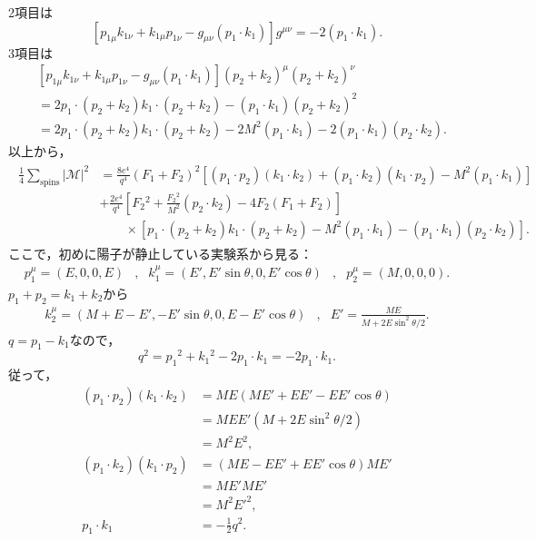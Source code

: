 2項目は
\[  [ p_{1\mu}k_{1\nu} + k_{1\mu}p_{1\nu} - g_{\mu\nu} (p_1 \cdot k_1) ] g^{\mu\nu} = -2 (p_1 \cdot k_1) . \]
3項目は
\begin{align*}
  & [ p_{1\mu}k_{1\nu} + k_{1\mu}p_{1\nu} - g_{\mu\nu} (p_1 \cdot k_1) ] (p_2 + k_2)^\mu (p_2 + k_2)^\nu \\
  &= 2 p_1 \cdot (p_2 + k_2) k_1 \cdot (p_2 + k_2) - (p_1 \cdot k_1) (p_2 + k_2)^2 \\
  &= 2 p_1 \cdot (p_2 + k_2) k_1 \cdot (p_2 + k_2) - 2M^2(p_1 \cdot k_1) - 2 (p_1 \cdot k_1)(p_2 \cdot k_2) .
\end{align*}
以上から，
\begin{align}
  \begin{split}
    \frac{1}{4}\sum_\text{spins} \lvert\mathcal{M}\rvert^2 &= \frac{8e^4}{q^4}
    (F_1 + F_2)^2 [(p_1 \cdot p_2)(k_1 \cdot k_2) + (p_1 \cdot k_2)(k_1 \cdot p_2) - M^2(p_1 \cdot k_1) ] \\
    & + \frac{2e^4}{q^4} \left[ F_2{}^2 + \frac{F_2{}^2}{M^2} (p_2 \cdot k_2) - 4F_2(F_1 + F_2) \right] \\
    & \qquad \times [ p_1 \cdot (p_2 + k_2) k_1 \cdot (p_2 + k_2) - M^2(p_1 \cdot k_1) - (p_1 \cdot k_1)(p_2 \cdot k_2) ] .
  \end{split}
  \label{prob6_1_eq1}
\end{align}
ここで，初めに陽子が静止している実験系から見る：
\begin{align*}
  p_1^\mu = (E, 0, 0, E) & , & k_1^\mu = (E', E'\sin\theta, 0, E'\cos\theta) & , &
  p_2^\mu = (M, 0, 0, 0) .
\end{align*}
$p_1 + p_2 = k_1 + k_2$から
\begin{align*}
  k_2^\mu = (M + E - E', - E'\sin\theta, 0, E - E'\cos\theta) &,  & E'= \frac{ME}{M + 2E\sin^2\theta/2} .
\end{align*}
$q = p_1 - k_1$なので，
\[ q^2 = p_1{}^2 + k_1{}^2 - 2 p_1\cdot k_1 = - 2 p_1\cdot k_1 . \]
従って，
\begin{align*}
  (p_1 \cdot p_2)(k_1 \cdot k_2) &= ME (ME' + EE' - EE'\cos\theta) \\
  &= MEE' \left( M + 2E\sin^2\theta/2 \right) \\
  &= M^2E^2 , \\
  (p_1 \cdot k_2)(k_1 \cdot p_2) &= (ME - EE' + EE'\cos\theta) ME' \\
  &= ME' ME' \\
  &= M^2E'^2 , \\
  p_1 \cdot k_1 &= -\frac{1}{2} q^2 .
\end{align*}

